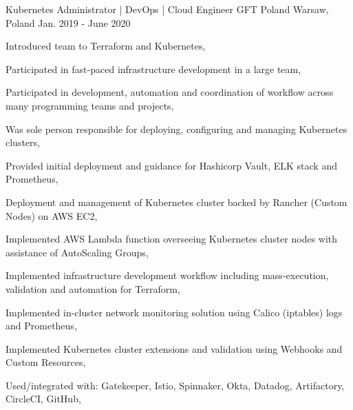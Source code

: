 \begin{cventries}
  \cventry
  {Kubernetes Administrator | DevOps | Cloud Engineer} %
  {GFT Poland} %
  {Warsaw, Poland} %
  {Jan. 2019 - June 2020} %
  {
    \begin{cvitems} %
      \item {Introduced team to Terraform and Kubernetes,}
      \item {Participated in fast-paced infrastructure development in a large team,}
      \item {Participated in development, automation and coordination of workflow across many programming teams and projects,}
      \item {Was sole person responsible for deploying, configuring and managing Kubernetes clusters,}
      \item {Provided initial deployment and guidance for Hashicorp Vault, ELK stack and Prometheus,}
      \item {Deployment and management of Kubernetes cluster backed by Rancher (Custom Nodes) on AWS EC2,}
      \item {Implemented AWS Lambda function overseeing Kubernetes cluster nodes with assistance of AutoScaling Groups,}
      \item {Implemented infrastructure development workflow including mass-execution, validation and automation for Terraform,}
      \item {Implemented in-cluster network monitoring solution using Calico (iptables) logs and Prometheus,}
      \item {Implemented Kubernetes cluster extensions and validation using Webhooks and Custom Resources,}
      \item {Used/integrated with: Gatekeeper, Istio, Spinnaker, Okta, Datadog, Artifactory, CircleCI, GitHub,}
    \end{cvitems}
  }


\end{cventries}
